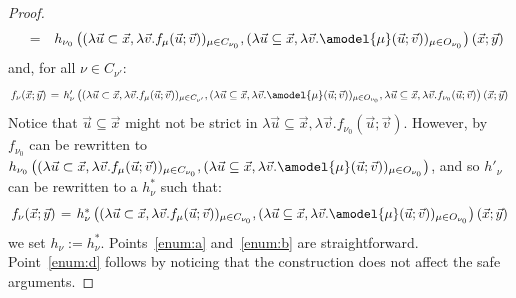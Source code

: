 \documentclass[manuscript,screen]{acmart}
\newcommand{\dfn}{:=}
\newcommand{\red}[1]{{\color{red}#1}}
\theoremstyle{definition}
\theoremstyle{remark}
\newcommand{\model}[1]{\denot{#1}}
\newcommand{\denot}[1]{f_{#1}}
\newcommand{\der}{\mathcal{D}}
\newcommand{\pder}[1]{\der_{#1}}
\newcommand{\close}[1]{{C}_{#1}}
\newcommand{\open}[1]{{O}_{#1}}
\newcommand{\hnu}{\nu_0}
\begin{document}
\begin{proof}
\begin{equation}
\begin{array}{rcll}
       &=& 
      h_{\hnu}\left(( \lambda \vec{u}\subset \vec{x}, \lambda \vec v. \model{{\mu}}(\vec{u};\vec{v}))_{\mu \in \close{\hnu}},( \lambda \vec{u}\subseteq \vec{x}, \lambda \vec v. \amodel{{\mu}}(\vec{u};\vec{v}))_{\mu \in  \open{\hnu}}\right)(\vec{x}; \vec{y})
\end{array}
\end{equation}
and, for all $  \nu \in \close{\nu'}$:
\begin{equation}\label{eqn:4}
\arraycolsep=2pt
\begin{array}{rcll}
    \model{{\nu}}(\vec{x}; \vec{y})
     &=& 
      h'_{\nu}\left(( \lambda \vec{u}\subset \vec{x}, \lambda \vec v. \model{{\mu}}(\vec{u};\vec{v}))_{\mu \in \close{\nu'}},( \lambda \vec{u}\subseteq \vec{x}, \lambda \vec v. \amodel{{\mu}}(\vec{u};\vec{v}))_{\mu \in  \open{\hnu}}, \lambda \vec{u}\subseteq \vec{x}, \lambda \vec v. \model{{\hnu}}(\vec{u};\vec{v})\right)(\vec{x}; \vec{y})
   \end{array}
\end{equation}
Notice that $\vec{u}\subseteq \vec{x}$ might not be strict in $ \lambda \vec{u}\subseteq \vec{x}, \lambda \vec v. \model{{\hnu}}(\vec{u};\vec{v})$. However, by~ $f_{\hnu}$ can be rewritten to $  h_{\hnu}\left(( \lambda \vec{u}\subset \vec{x}, \lambda \vec v. \model{{\mu}}(\vec{u};\vec{v}))_{\mu \in \close{\hnu}},( \lambda \vec{u}\subseteq \vec{x}, \lambda \vec v. \amodel{{\mu}}(\vec{u};\vec{v}))_{\mu \in  \open{\hnu}}\right)$, and so $h'_\nu$ can be rewritten to a $h^*_\nu$ such that:
\begin{equation}\label{eqn:5}
\arraycolsep=2pt
\begin{array}{rcll}
    \model{{\nu}}(\vec{x}; \vec{y})
     &=& 
      h^*_{\nu}\left(( \lambda \vec{u}\subset \vec{x}, \lambda \vec v. \model{{\mu}}(\vec{u};\vec{v}))_{\mu \in \close{\hnu}},( \lambda \vec{u}\subseteq \vec{x}, \lambda \vec v. \amodel{{\mu}}(\vec{u};\vec{v}))_{\mu \in  \open{\hnu}}\right)(\vec{x}; \vec{y})
   \end{array}
\end{equation}
we set $h_\nu\dfn h^*_\nu$. Points~\ref{enum:a} and~\ref{enum:b} are straightforward.  Point~\ref{enum:d} follows  by noticing that the construction does not affect the safe arguments.

\end{proof}
\end{document}
